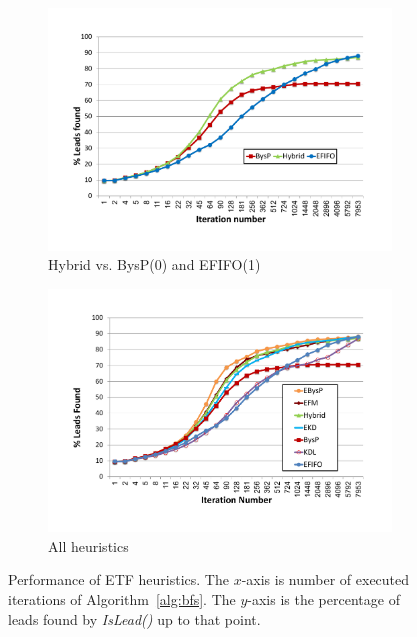 \documentclass[prodmode,acmtecs]{acmsmall} %
\newcommand{\islead}[1]{{\em IsLead(#1)}}
\begin{document}
\begin{figure}[t]

\begin{subfigure}{0.5\columnwidth}%
\centering
\includegraphics[width=\textwidth, trim={2.0cm 2.5cm 2.5cm 2.0cm},clip]{PROMISE_FIFONL_HYBRID.pdf}
\caption{\label{fig:PROMISE_FIFONL_HYBRID}Hybrid vs. BysP(0) and EFIFO(1)}%
\end{subfigure}
\begin{subfigure}{0.5\columnwidth}
\centering
\includegraphics[width=\textwidth, trim={2.0cm 2.5cm 2.5cm 2.0cm},clip]{all_nl_with_promise.pdf}%
\caption{\label{fig:all-nl}All heuristics}%
\end{subfigure}%

\caption{Performance of ETF heuristics. The $x$-axis is number of executed iterations of Algorithm~\ref{alg:bfs}. The $y$-axis is the percentage of leads found by \islead{} up to that point.}
\end{figure}
\end{document}
